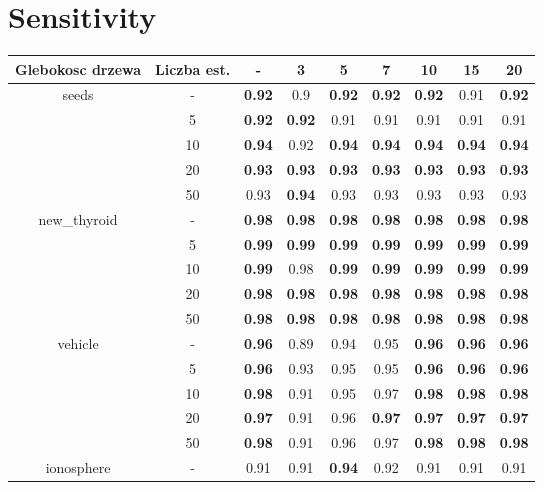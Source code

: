 \documentclass{article}%
\begin{document}
\section*{Sensitivity}%
\begin{longtable}{c|c|ccccccc}%
\hline%
Glebokosc drzewa&Liczba est.&{-}&3&5&7&10&15&20\\%
\hline%
\multirow{5}{*}{seeds}&{-}&\textbf{0.92}&0.9&\textbf{0.92}&\textbf{0.92}&\textbf{0.92}&0.91&\textbf{0.92}\\%
\cline{2%
-%
9}%
&5&\textbf{0.92}&\textbf{0.92}&0.91&0.91&0.91&0.91&0.91\\%
\cline{2%
-%
9}%
&10&\textbf{0.94}&0.92&\textbf{0.94}&\textbf{0.94}&\textbf{0.94}&\textbf{0.94}&\textbf{0.94}\\%
\cline{2%
-%
9}%
&20&\textbf{0.93}&\textbf{0.93}&\textbf{0.93}&\textbf{0.93}&\textbf{0.93}&\textbf{0.93}&\textbf{0.93}\\%
\cline{2%
-%
9}%
&50&0.93&\textbf{0.94}&0.93&0.93&0.93&0.93&0.93\\%
\hline%
\multirow{5}{*}{new\_thyroid}&{-}&\textbf{0.98}&\textbf{0.98}&\textbf{0.98}&\textbf{0.98}&\textbf{0.98}&\textbf{0.98}&\textbf{0.98}\\%
\cline{2%
-%
9}%
&5&\textbf{0.99}&\textbf{0.99}&\textbf{0.99}&\textbf{0.99}&\textbf{0.99}&\textbf{0.99}&\textbf{0.99}\\%
\cline{2%
-%
9}%
&10&\textbf{0.99}&0.98&\textbf{0.99}&\textbf{0.99}&\textbf{0.99}&\textbf{0.99}&\textbf{0.99}\\%
\cline{2%
-%
9}%
&20&\textbf{0.98}&\textbf{0.98}&\textbf{0.98}&\textbf{0.98}&\textbf{0.98}&\textbf{0.98}&\textbf{0.98}\\%
\cline{2%
-%
9}%
&50&\textbf{0.98}&\textbf{0.98}&\textbf{0.98}&\textbf{0.98}&\textbf{0.98}&\textbf{0.98}&\textbf{0.98}\\%
\hline%
\multirow{5}{*}{vehicle}&{-}&\textbf{0.96}&0.89&0.94&0.95&\textbf{0.96}&\textbf{0.96}&\textbf{0.96}\\%
\cline{2%
-%
9}%
&5&\textbf{0.96}&0.93&0.95&0.95&\textbf{0.96}&\textbf{0.96}&\textbf{0.96}\\%
\cline{2%
-%
9}%
&10&\textbf{0.98}&0.91&0.95&0.97&\textbf{0.98}&\textbf{0.98}&\textbf{0.98}\\%
\cline{2%
-%
9}%
&20&\textbf{0.97}&0.91&0.96&\textbf{0.97}&\textbf{0.97}&\textbf{0.97}&\textbf{0.97}\\%
\cline{2%
-%
9}%
&50&\textbf{0.98}&0.91&0.96&0.97&\textbf{0.98}&\textbf{0.98}&\textbf{0.98}\\%
\hline%
\multirow{5}{*}{ionosphere}&{-}&0.91&0.91&\textbf{0.94}&0.92&0.91&0.91&0.91\\%

\end{longtable}
\end{document}
